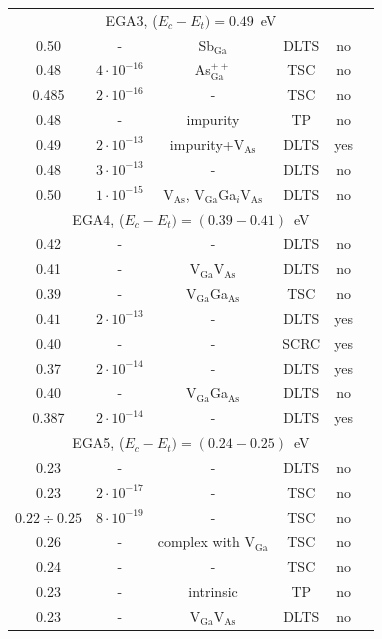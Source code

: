 \documentclass[final,3p,times,twocolumn,authoryear]{elsarticle}
\begin{document}
\begin{table}
\begin{tabular}{cccccc}
\multicolumn{6}{c}{EGA3, ($E_c-E_t)=0.49$~eV}\\
0.50&-&Sb$_\mathrm{Ga}$&DLTS&no&\cite{Samoilov1994En}\\ %
0.48&$4\cdot10^{-16}$&As$_\mathrm{Ga}^{++}$&TSC&no&\cite{Pavlovic2000}\\ %
0.485&$2\cdot10^{-16}$&-&TSC&no&\cite{Pavlovic:GaAs}\\ %
0.48&-&impurity&TP&no&\cite{Abele:GaAs}\\ %
0.49&$2\cdot10^{-13}$&impurity+V$_\mathrm{As}$&DLTS&yes&\cite{GaAsBlood}\\ %
0.48&$3\cdot10^{-13}$&-&DLTS&no&\cite{Lang:GaAs}\\ %
0.50&$1\cdot10^{-15}$&V$_\mathrm{As}$, V$_\mathrm{Ga}$Ga$_i$V$_\mathrm{As}$ &DLTS&no&\cite{Pons}\\
\multicolumn{6}{c}{EGA4, ($E_c-E_t)=(0.39-0.41)$~eV}\\
0.42&-&-&DLTS&no&\cite{Neild1991}\\ %
0.41&-&V$_\mathrm{Ga}$V$_\mathrm{As}$&DLTS&no&\cite{Samoilov1994En}\\ %
$0.39$&-&V$_\mathrm{Ga}$Ga$_\mathrm{As}$&TSC&no&\cite{FANG1990}\\ %
$0.41$&$2\cdot10^{-13}$&-&DLTS&yes&\cite{Bourgoin:GaAs}\\ %
0.40&-&-&SCRC&yes&\cite{ASHBY:GaAs}\\ %
0.37&$2\cdot10^{-14}$&-&DLTS&yes&\cite{Fang:EL6}\\ %
0.40&-&V$_\mathrm{Ga}$Ga$_\mathrm{As}$&DLTS&no&\cite{VaitkusEn}\\ %
0.387&$2\cdot10^{-14}$&-&DLTS&yes&\cite{Yousefi1995}\\ %
\multicolumn{6}{c}{EGA5, ($E_c-E_t)=(0.24-0.25)$~eV}\\
0.23&-&-&DLTS&no&\cite{Neild1991}\\ %
0.23&$2\cdot10^{-17}$&-&TSC&no&\cite{Pavlovic2000}\\ %
$0.22\div0.25$&$8\cdot10^{-19}$&-&TSC&no&\cite{Lin:GaAs}\\ %
$0.26$&-&complex with V$_\mathrm{Ga}$&TSC&no&\cite{FANG1990}\\ %
0.24&-&-&TSC&no&\cite{Tomozane:GaAs}\\ %
0.23&-&intrinsic&TP&no&\cite{Abele:GaAs}\\ %
0.23&-&V$_\mathrm{Ga}$V$_\mathrm{As}$&DLTS&no&\cite{Morrow:EL17}\\ %

\end{tabular}
\end{table}
\end{document}
